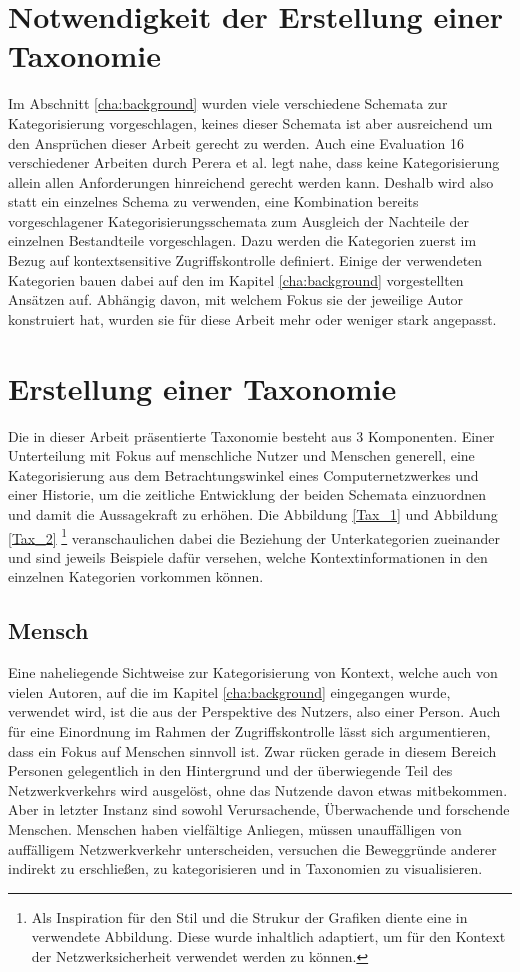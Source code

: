 \section{Notwendigkeit der Erstellung einer Taxonomie }
Im Abschnitt \ref{cha:background} wurden viele verschiedene Schemata zur Kategorisierung vorgeschlagen, keines dieser Schemata ist aber ausreichend um den Ansprüchen dieser Arbeit gerecht zu werden. Auch eine Evaluation 16 verschiedener Arbeiten durch Perera et al. \cite{perera_context_2014} legt nahe, dass keine Kategorisierung allein allen Anforderungen hinreichend gerecht werden kann.
Deshalb wird also statt ein einzelnes Schema zu verwenden, eine Kombination bereits vorgeschlagener Kategorisierungsschemata zum Ausgleich der Nachteile der einzelnen Bestandteile vorgeschlagen. Dazu werden die Kategorien zuerst im Bezug auf kontextsensitive Zugriffskontrolle definiert. Einige der verwendeten Kategorien bauen dabei auf den im Kapitel \ref{cha:background} vorgestellten Ansätzen auf. Abhängig davon, mit welchem Fokus sie der jeweilige Autor konstruiert hat, wurden sie für diese Arbeit mehr oder weniger stark angepasst.
\section{Erstellung einer Taxonomie}
Die in dieser Arbeit präsentierte Taxonomie besteht aus 3 Komponenten. Einer Unterteilung mit Fokus auf menschliche Nutzer und Menschen generell, eine Kategorisierung aus dem Betrachtungswinkel eines Computernetzwerkes und einer Historie, um die zeitliche Entwicklung der beiden Schemata einzuordnen und damit die Aussagekraft zu erhöhen.
Die Abbildung \ref{Tax_1} und Abbildung \ref{Tax_2} \footnote{Als Inspiration für den Stil und die Strukur der Grafiken diente eine in \cite{perera_context_2014} verwendete Abbildung. Diese wurde inhaltlich adaptiert, um für den Kontext der Netzwerksicherheit verwendet werden zu können.}  veranschaulichen dabei die Beziehung der Unterkategorien zueinander und sind jeweils Beispiele dafür versehen, welche Kontextinformationen in den einzelnen Kategorien vorkommen können. 
\subsection{Mensch}
Eine naheliegende Sichtweise zur Kategorisierung von Kontext, welche auch von vielen Autoren, auf die im Kapitel \ref{cha:background} eingegangen wurde, verwendet wird, ist die aus der Perspektive des Nutzers, also einer Person. Auch für eine Einordnung im Rahmen der Zugriffskontrolle lässt sich argumentieren, dass ein Fokus auf Menschen sinnvoll ist. Zwar rücken gerade in diesem Bereich Personen gelegentlich in den Hintergrund und der überwiegende Teil des Netzwerkverkehrs wird ausgelöst, ohne das Nutzende davon etwas mitbekommen. Aber in letzter Instanz sind sowohl Verursachende, Überwachende und forschende Menschen. Menschen haben vielfältige Anliegen, müssen unauffälligen von auffälligem Netzwerkverkehr unterscheiden, versuchen die Beweggründe anderer indirekt zu erschließen, zu kategorisieren und in Taxonomien zu visualisieren.

